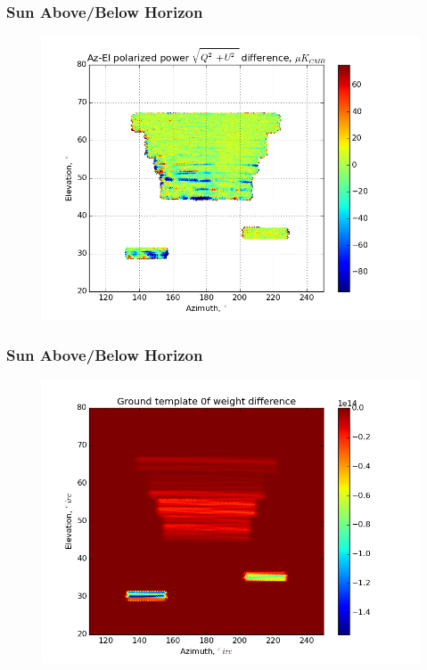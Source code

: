 \documentclass{beamer}
\begin{document}
\begin{frame}
\frametitle{Sun Above/Below Horizon}
\begin{figure}
\includegraphics[width=0.9\linewidth]{dMag_gt_SUN_HORIZON.png}
\end{figure}
\end{frame}

\begin{frame}
\frametitle{Sun Above/Below Horizon}
\begin{figure}
\includegraphics[width=0.9\linewidth]{dw0_gt_SUN_HORIZON.png}
\end{figure}
\end{frame}
\end{document}
